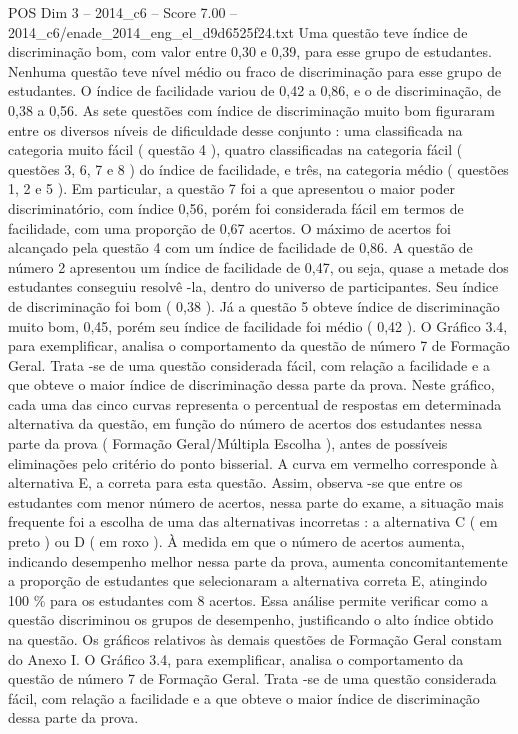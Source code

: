\begin{textsample}{POS Dim 3 – 2014\_c6 – Score 7.00 – 2014\_c6/enade\_2014\_eng\_el\_d9d6525f24.txt}
Uma questão teve índice de discriminação bom, com valor entre 0,30 e 0,39, para esse grupo de estudantes.
Nenhuma questão teve nível médio ou fraco de discriminação para esse grupo de estudantes.
O índice de facilidade variou de 0,42 a 0,86, e o de discriminação, de 0,38 a 0,56.
As sete questões com índice de discriminação muito bom figuraram entre os diversos níveis de dificuldade desse conjunto : uma classificada na categoria muito fácil ( questão 4 ), quatro classificadas na categoria fácil ( questões 3, 6, 7 e 8 ) do índice de facilidade, e três, na categoria médio ( questões 1, 2 e 5 ).
Em particular, a questão 7 foi a que apresentou o maior poder discriminatório, com índice 0,56, porém foi considerada fácil em termos de facilidade, com uma proporção de 0,67 acertos.
O máximo de acertos foi alcançado pela questão 4 com um índice de facilidade de 0,86.
A questão de número 2 apresentou um índice de facilidade de 0,47, ou seja, quase a metade dos estudantes conseguiu resolvê -la, dentro do universo de participantes.
Seu índice de discriminação foi bom ( 0,38 ).
Já a questão 5 obteve índice de discriminação muito bom, 0,45, porém seu índice de facilidade foi médio ( 0,42 ).
O Gráfico 3.4, para exemplificar, analisa o comportamento da questão de número 7 de Formação Geral.
Trata -se de uma questão considerada fácil, com relação a facilidade e a que obteve o maior índice de discriminação dessa parte da prova.
Neste gráfico, cada uma das cinco curvas representa o percentual de respostas em determinada alternativa da questão, em função do número de acertos dos estudantes nessa parte da prova ( Formação Geral/Múltipla Escolha ), antes de possíveis eliminações pelo critério do ponto bisserial.
A curva em vermelho corresponde à alternativa E, a correta para esta questão.
Assim, observa -se que entre os estudantes com menor número de acertos, nessa parte do exame, a situação mais frequente foi a escolha de uma das alternativas incorretas : a alternativa C ( em preto ) ou D ( em roxo ).
À medida em que o número de acertos aumenta, indicando desempenho melhor nessa parte da prova, aumenta concomitantemente a proporção de estudantes que selecionaram a alternativa correta E, atingindo 100 \% para os estudantes com 8 acertos.
Essa análise permite verificar como a questão discriminou os grupos de desempenho, justificando o alto índice obtido na questão.
Os gráficos relativos às demais questões de Formação Geral constam do Anexo I.
O Gráfico 3.4, para exemplificar, analisa o comportamento da questão de número 7 de Formação Geral.
Trata -se de uma questão considerada fácil, com relação a facilidade e a que obteve o maior índice de discriminação dessa parte da prova.

\end{textsample}
